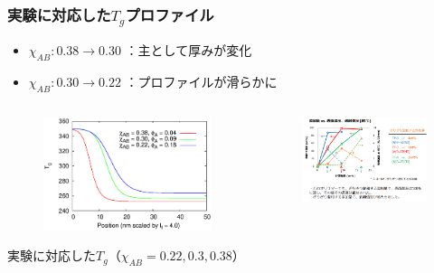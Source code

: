 \documentclass[12pt, dvipdfmx]{beamer}
\begin{document}
\begin{frame}\frametitle{実験に対応した$T_g$プロファイル}

\vspace{-0.5\baselineskip}
\begin{itemize}
	\item $\chi_{AB}: 0.38 \rightarrow 0.30$ ：主として厚みが変化
	\item $\chi_{AB}: 0.30 \rightarrow 0.22$ ：プロファイルが滑らかに
\end{itemize}

\begin{columns}
	\begin{column}{6.0cm}
		\vspace{-1\baselineskip}
		\begin{figure}[htbp]
			\begin{center}
				\includegraphics[width=60mm]{Tg.eps}
			\end{center}
		\end{figure}
		\begin{center}
			\vspace{-1\baselineskip}
			{\footnotesize 実験に対応した$T_g$（$\chi_{AB} = 0.22, 0.3, 0.38$）}
		\end{center}
	\end{column}
	\begin{column}{6.0cm}

		\vspace{-1\baselineskip}
		\begin{figure}[htbp]
			\begin{center}
				\includegraphics[width=45mm]{tennkaryou_3.png}
			\end{center}
		\end{figure}
		

\end{column}
\end{columns}
\end{frame}
\end{document}

